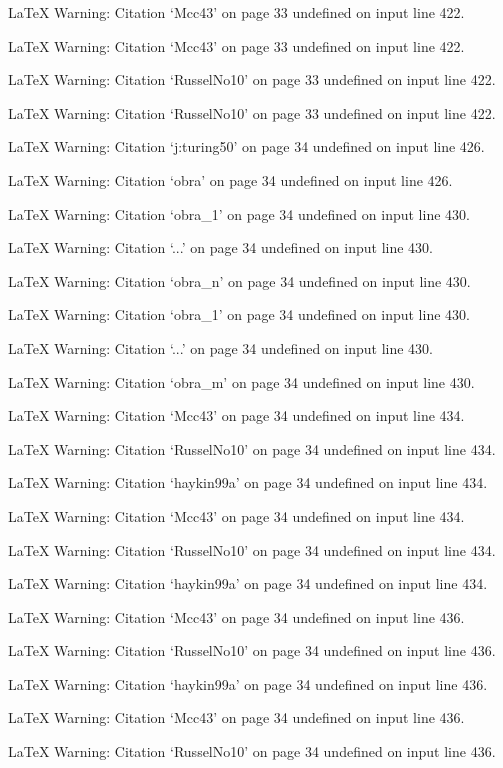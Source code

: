 LaTeX Warning: Citation `Mcc43' on page 33 undefined on input line 422.


LaTeX Warning: Citation `Mcc43' on page 33 undefined on input line 422.


LaTeX Warning: Citation `RusselNo10' on page 33 undefined on input line 422.


LaTeX Warning: Citation `RusselNo10' on page 33 undefined on input line 422.


LaTeX Warning: Citation `j:turing50' on page 34 undefined on input line 426.


LaTeX Warning: Citation `obra' on page 34 undefined on input line 426.


LaTeX Warning: Citation `obra_1' on page 34 undefined on input line 430.


LaTeX Warning: Citation `...' on page 34 undefined on input line 430.


LaTeX Warning: Citation `obra_n' on page 34 undefined on input line 430.


LaTeX Warning: Citation `obra_1' on page 34 undefined on input line 430.


LaTeX Warning: Citation `...' on page 34 undefined on input line 430.


LaTeX Warning: Citation `obra_m' on page 34 undefined on input line 430.


LaTeX Warning: Citation `Mcc43' on page 34 undefined on input line 434.


LaTeX Warning: Citation `RusselNo10' on page 34 undefined on input line 434.


LaTeX Warning: Citation `haykin99a' on page 34 undefined on input line 434.


LaTeX Warning: Citation `Mcc43' on page 34 undefined on input line 434.


LaTeX Warning: Citation `RusselNo10' on page 34 undefined on input line 434.


LaTeX Warning: Citation `haykin99a' on page 34 undefined on input line 434.


LaTeX Warning: Citation `Mcc43' on page 34 undefined on input line 436.


LaTeX Warning: Citation `RusselNo10' on page 34 undefined on input line 436.


LaTeX Warning: Citation `haykin99a' on page 34 undefined on input line 436.


LaTeX Warning: Citation `Mcc43' on page 34 undefined on input line 436.


LaTeX Warning: Citation `RusselNo10' on page 34 undefined on input line 436.


